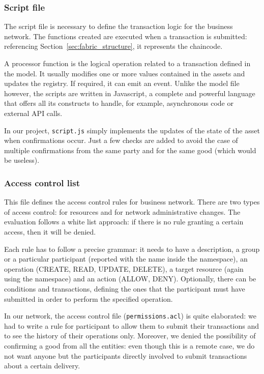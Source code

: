 \subsubsection{Script file}
The script file is necessary to define the transaction logic for the business network. The functions created are executed when a transaction is submitted: referencing Section~\ref{sec:fabric_structure}, it represents the chaincode.

A processor function is the logical operation related to a transaction defined in the model. It usually modifies one or more values contained in the assets and updates the registry. If required, it can emit an event. Unlike the model file however, the scripts are written in Javascript, a complete and powerful language that offers all its constructs to handle, for example, asynchronous code or external API calls.

In our project, \texttt{script.js} simply implements the updates of the state of the asset when confirmations occur. Just a few checks are added to avoid the case of multiple confirmations from the same party and for the same good (which would be useless).

\subsubsection{Access control list}
This file defines the access control rules for business network. There are two types of access control: for resources and for network administrative changes. The evaluation follows a white list approach: if there is no rule granting a certain access, then it will be denied.

Each rule has to follow a precise grammar: it needs to have a description, a group or a particular participant (reported with the name inside the namespace), an operation (CREATE, READ, UPDATE, DELETE), a target resource (again using the namespace) and an action (ALLOW, DENY). Optionally, there can be conditions and transactions, defining the ones that the participant must have submitted in order to perform the specified operation.

In our network, the access control file (\texttt{permissions.acl}) is quite elaborated: we had to write a rule for participant to allow them to submit their transactions and to see the history of their operations only. Moreover, we denied the possibility of confirming a good from all the entities: even though this is a remote case, we do not want anyone but the participants directly involved to submit transactions about a certain delivery.

